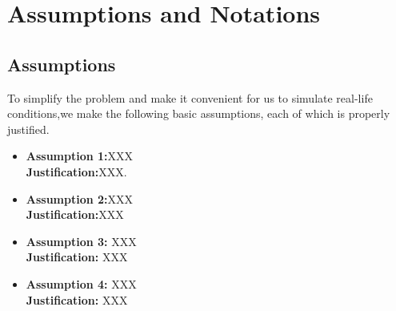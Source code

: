 \documentclass[12pt]{article}  %
\numberwithin{equation}{section} %
\begin{document}
\section{Assumptions and Notations}
\subsection{Assumptions}
To simplify the problem and make it convenient for us to simulate real-life conditions,we make the following basic assumptions, each of which is properly justified.
\begin{itemize}
	\setlength{\parsep}{0ex} %
	\setlength{\topsep}{2ex} %
	\setlength{\itemsep}{1ex} %
	\item \textbf{Assumption 1:}XXX\\
    \textbf{Justification:}XXX.
    \item \textbf{Assumption 2:}XXX \\
    \textbf{Justification:}XXX 
    \item \textbf{Assumption 3:} XXX\\
    \textbf{Justification:} XXX
    \item \textbf{Assumption 4:} XXX\\
    \textbf{Justification:} XXX

\end{itemize}

\vspace{-1.0em}
\end{document}
